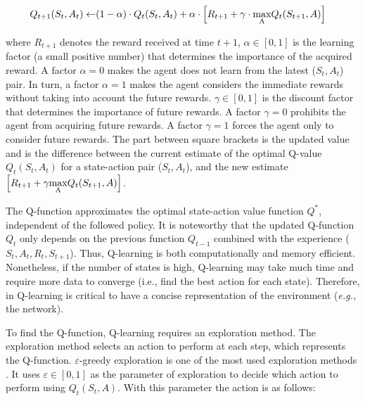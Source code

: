 \begin{equation}
    \begin{split}
        Q_{t+1}(S_t,A_t) \leftarrow & (1-\alpha) \cdot Q_{t}(S_t,A_t) + \alpha \cdot \left [R_{t+1} + \gamma \cdot \underset{\rm A}{\rm max} Q_{t}(S_{t+1},A) \right]
    \end{split}
    \label{equ:q_function}
\end{equation}

where $R_{t+1}$ denotes the reward received at time $t+ 1$, $\alpha \in \left [ 0,1 \right ]$ is the learning factor (a small positive number) that determines the importance of the acquired reward. A factor $\alpha = 0$ makes the agent does not learn from the latest ($S_t,A_t$) pair. In turn, a factor $\alpha = 1$ makes the agent considers the immediate rewards without taking into account the future rewards. $\gamma \in \left [ 0,1 \right ]$ is the discount factor that determines the importance of future rewards. A factor $\gamma = 0$ prohibits the agent from acquiring future rewards. A factor $\gamma = 1$ forces the agent only to consider future rewards. The part between square brackets is the updated value and is the difference between the current estimate of the optimal Q-value $Q_t(S_t,A_t)$ for a state-action pair ($  S_{t}, A_{t} $), and the new estimate $ \left [R_{t+1} + \gamma  \underset{\rm A}{\rm max} Q_t(S_{t+1},A) \right ]$. 

The Q-function approximates the optimal state-action value function $ Q^*$, independent of the followed policy. It is noteworthy that the updated Q-function $Q_{t} $ only depends on the previous function $Q_{t-1} $ combined with the experience ($S_{t}, A_{t}, R_{t}, S_{t+1}$). Thus, Q-learning is both computationally and memory efficient. Nonetheless, if the number of states is high, Q-learning may take much time and require more data to converge (i.e., find the best action for each state). Therefore, in Q-learning is critical to have a concise representation of the environment (\textit{e.g.,} the network).

To find the Q-function, Q-learning requires an exploration method. The exploration method selects an action to perform at each step, which represents the Q-function. $\varepsilon$-greedy exploration is one of the most used exploration methods \cite{teng_2012:exploration} \cite{Tijsma_2016:exploration_q_learning}. It uses $\varepsilon \in \left [ 0,1 \right ]$ as the parameter of exploration to decide which action to perform using $Q_{t}(S_{t},A)$. With this parameter the action is as follows:

